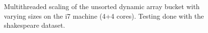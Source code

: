 \begin{landscape}
\begin{figure}[!h]
{        }
        \label{fig:ts_i7_shake_unsorted}
        \caption{Multithreaded scaling of the unsorted dynamic array bucket with varying sizes on the
        i7 machine (4+4 cores). Testing done with the shakespeare dataset.}
    \end{figure}
    \begin{figure}[!h]
\end{figure}
\end{landscape}

